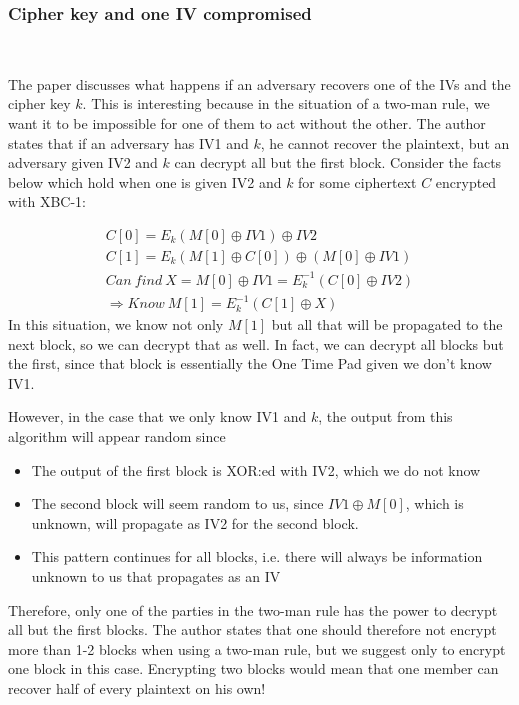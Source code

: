 \documentclass[conference]{IEEEtran}
\begin{document}
\subsubsection{Cipher key and one IV compromised} \

The paper discusses what happens if an adversary recovers one of the IVs and the cipher key $k$. This is interesting because in the situation of a two-man rule, we want it to be impossible for one of them to act without the other. The author states that if an adversary has IV1 and $k$, he cannot recover the plaintext, but an adversary given IV2 and $k$ can decrypt all but the first block. Consider the facts below which hold when one is given IV2 and $k$ for some ciphertext $C$ encrypted with XBC-1:

\begin{gather*}
  C[0] = E_k(M[0] \oplus IV1) \oplus IV2 \\
  C[1] = E_k(M[1] \oplus C[0]) \oplus (M[0] \oplus IV1) \\
  Can\ find\ X=M[0] \oplus IV1 = E_k^{-1}(C[0] \oplus IV2) \\
  \Rightarrow Know\ M[1] = E_k^{-1}(C[1] \oplus X)
\end{gather*}
In this situation, we know not only $M[1]$ but all that will be propagated to the next block, so we can decrypt that as well. In fact, we can decrypt all blocks but the first, since that block is essentially the One Time Pad given we don't know IV1.

However, in the case that we only know IV1 and $k$, the output from this algorithm will appear random since
\begin{itemize}
 \item The output of the first block is XOR:ed with IV2, which we do not know
 \item The second block will seem random to us, since $IV1 \oplus M[0]$, which is unknown, will propagate as IV2 for the second block.
 \item This pattern continues for all blocks, i.e. there will always be information unknown to us that propagates as an IV
\end{itemize}
Therefore, only one of the parties in the two-man rule has the power to decrypt all but the first blocks. The author states that one should therefore not encrypt more than 1-2 blocks when using a two-man rule, but we suggest only to encrypt one block in this case. Encrypting two blocks would mean that one member can recover half of every plaintext on his own!
\end{document}
